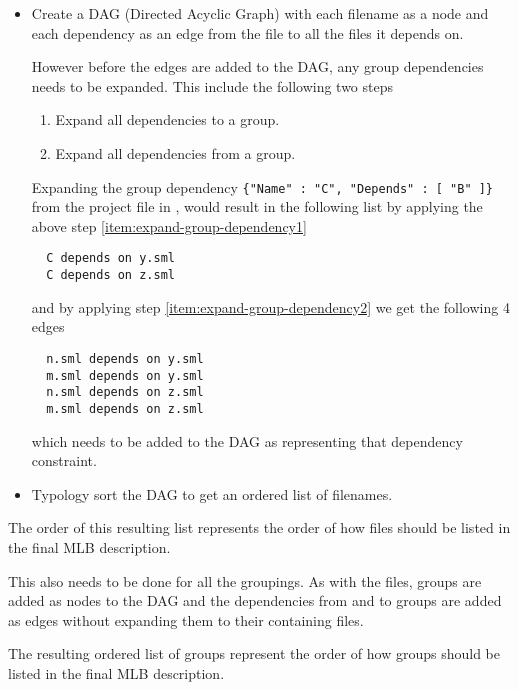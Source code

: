 \begin{itemize}
\item Create a DAG (Directed Acyclic Graph) with each filename as a node and
  each dependency as an edge from the file to all the files it depends on.

  
  However before the edges are added to the DAG, any group dependencies needs to
  be expanded. This include the following two steps
  
  \begin{enumerate}
  \item \label{item:expand-group-dependency1} Expand all dependencies to a
    group.
  \item \label{item:expand-group-dependency2} Expand all dependencies from a
    group.
  \end{enumerate}
  
  Expanding the group dependency \texttt{\{"Name" : "C", "Depends" : [ "B" ]\}}
  from the project file in ,
  would result in the following list by applying the above step
  \ref{item:expand-group-dependency1}
  
\begin{lstlisting}
  C depends on y.sml
  C depends on z.sml
\end{lstlisting}
  
  and by applying step \ref{item:expand-group-dependency2} we get the following
  4 edges
  
\begin{lstlisting}
  n.sml depends on y.sml
  m.sml depends on y.sml
  n.sml depends on z.sml
  m.sml depends on z.sml
\end{lstlisting}
  
  which needs to be added to the DAG as representing that dependency constraint.
  
\item Typology sort the DAG to get an ordered list of filenames.
\end{itemize}

The order of this resulting list represents the order of how files should be
listed in the final MLB description. 


This also needs to be done for all the groupings. As with the files, groups are
added as nodes to the DAG and the dependencies from and to groups are added as
edges without expanding them to their containing files.

The resulting ordered list of groups represent the order of how groups should be
listed in the final MLB description.


